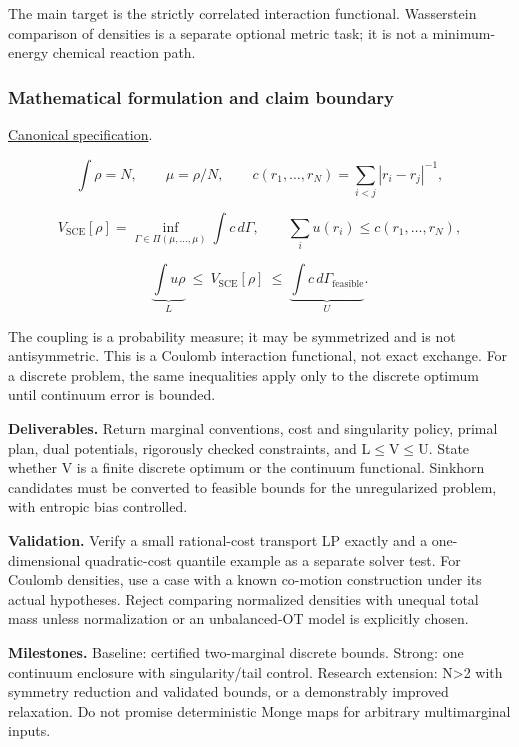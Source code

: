 \documentclass[
  11pt,
]{article}
\begin{document}
The main target is the strictly correlated interaction functional.
Wasserstein comparison of densities is a separate optional metric task;
it is not a minimum-energy chemical reaction path.

\subsubsection{Mathematical formulation and claim boundary}

\href{https://github.com/rick-stevens-ai/Pure-Thought/blob/main/PRDs/18-Optimal-Transport-Chemistry.md}{Canonical
specification}.

\[\int\rho=N,\qquad \mu=\rho/N,\qquad
c(r_1,\ldots,r_N)=\sum_{i<j}|r_i-r_j|^{-1},\]

\[V_{\mathrm{SCE}}[\rho]=\inf_{\Gamma\in\Pi(\mu,\ldots,\mu)}\int c\,d\Gamma,
\qquad \sum_i u(r_i)\le c(r_1,\ldots,r_N),\]

\[\underbrace{\int u\rho}_{L}\ \le\ V_{\mathrm{SCE}}[\rho]\ \le\
\underbrace{\int c\,d\Gamma_{\mathrm{feasible}}}_{U}.\]

The coupling is a probability measure; it may be symmetrized and is not
antisymmetric. This is a Coulomb interaction functional, not exact
exchange. For a discrete problem, the same inequalities apply only to
the discrete optimum until continuum error is bounded.

\textbf{Deliverables.} Return marginal conventions, cost and singularity
policy, primal plan, dual potentials, rigorously checked constraints,
and L\ensuremath{\le}V\ensuremath{\le}U. State whether V is a finite
discrete optimum or the continuum functional. Sinkhorn candidates must
be converted to feasible bounds for the unregularized problem, with
entropic bias controlled.

\textbf{Validation.} Verify a small rational-cost transport LP exactly
and a one-dimensional quadratic-cost quantile example as a separate
solver test. For Coulomb densities, use a case with a known co-motion
construction under its actual hypotheses. Reject comparing normalized
densities with unequal total mass unless normalization or an
unbalanced-OT model is explicitly chosen.

\textbf{Milestones.} Baseline: certified two-marginal discrete bounds.
Strong: one continuum enclosure with singularity/tail control. Research
extension: N\textgreater2 with symmetry reduction and validated bounds,
or a demonstrably improved relaxation. Do not promise deterministic
Monge maps for arbitrary multimarginal inputs.
\end{document}
